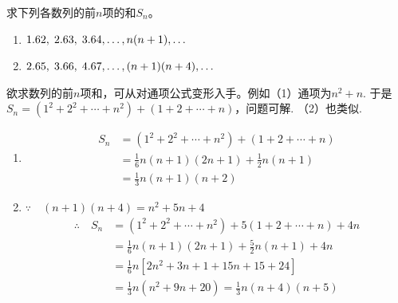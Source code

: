 \begin{example}
求下列各数列的前$n$项的和$S_n$。
\begin{enumerate}[(1)]
    \item $1.62,\; 2.63,\; 3.64,\ldots,n(n+1),\ldots$
\item $2.65,\; 3.66,\; 4.67,\ldots,(n+1)(n+4),\ldots$
\end{enumerate}
\end{example}

\begin{analyze}
    欲求数列的前$n$项和，可从对通项公式变形入手。例如（1）通项为$n^2+n$. 于是$S_n=(1^2+2^2+\cdots +n^2)+(1+2+\cdots+n)$，问题可解. （2）也类似.    
\end{analyze}

\begin{solution}
\begin{enumerate}[(1)]
    \item \[\begin{split}
S_n&=(1^2+2^2+\cdots+n^2)+(1+2+\cdots +n)\\
&=\frac{1}{6}n(n+1)(2n+1)+\frac{1}{2}n(n+1)\\
&=\frac{1}{3}n(n+1)(n+2)
    \end{split}\]
    \item $\because\quad (n+1)(n+4)=n^2+5n+4$
    \[\begin{split}
\therefore\quad S_n&=(1^2+2^2+\cdots+n^2)+5(1+2+\cdots +n)+4n\\
&=\frac{1}{6}n(n+1)(2n+1)+\frac{5}{2}n(n+1)+4n\\
&=\frac{1}{6}n[2n^2+3n+1+15n+15+24]\\
&=\frac{1}{3}n(n^2+9n+20)=\frac{1}{3}n(n+4)(n+5)
    \end{split}\]
\end{enumerate}
\end{solution}

